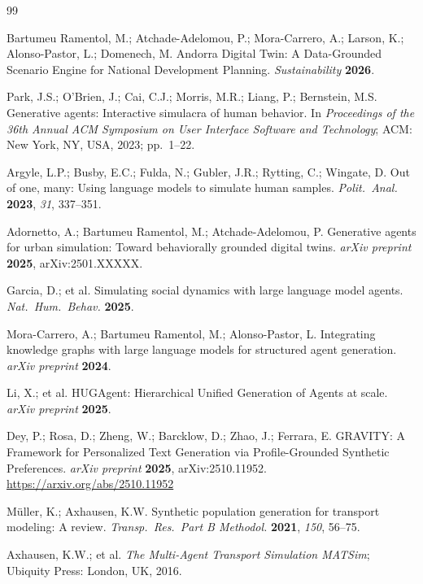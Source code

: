 \documentclass[a4paper,12pt]{article}
\begin{document}
\begin{thebibliography}{99}

Bartumeu Ramentol, M.; Atchade-Adelomou, P.; Mora-Carrero, A.; Larson, K.;
Alonso-Pastor, L.; Domenech, M. Andorra Digital Twin: A Data-Grounded Scenario
Engine for National Development Planning. \textit{Sustainability} \textbf{2026}.

Park, J.S.; O'Brien, J.; Cai, C.J.; Morris, M.R.; Liang, P.; Bernstein, M.S.
Generative agents: Interactive simulacra of human behavior.
In \textit{Proceedings of the 36th Annual ACM Symposium on User Interface
Software and Technology}; ACM: New York, NY, USA, 2023; pp.~1--22.

Argyle, L.P.; Busby, E.C.; Fulda, N.; Gubler, J.R.; Rytting, C.; Wingate, D.
Out of one, many: Using language models to simulate human samples.
\textit{Polit.\ Anal.} \textbf{2023}, \textit{31}, 337--351.

Adornetto, A.; Bartumeu Ramentol, M.; Atchade-Adelomou, P.
Generative agents for urban simulation: Toward behaviorally grounded digital
twins. \textit{arXiv preprint} \textbf{2025}, arXiv:2501.XXXXX.

Garcia, D.; et al. Simulating social dynamics with large language model agents.
\textit{Nat.\ Hum.\ Behav.} \textbf{2025}.

Mora-Carrero, A.; Bartumeu Ramentol, M.; Alonso-Pastor, L.
Integrating knowledge graphs with large language models for structured agent
generation. \textit{arXiv preprint} \textbf{2024}.

Li, X.; et al. HUGAgent: Hierarchical Unified Generation of Agents at scale.
\textit{arXiv preprint} \textbf{2025}.

Dey, P.; Rosa, D.; Zheng, W.; Barcklow, D.; Zhao, J.; Ferrara, E.
GRAVITY: A Framework for Personalized Text Generation via Profile-Grounded
Synthetic Preferences.
\textit{arXiv preprint} \textbf{2025}, arXiv:2510.11952.
\url{https://arxiv.org/abs/2510.11952}

M{\"u}ller, K.; Axhausen, K.W. Synthetic population generation for transport
modeling: A review. \textit{Transp.\ Res.\ Part B Methodol.} \textbf{2021},
\textit{150}, 56--75.

Axhausen, K.W.; et al.
\textit{The Multi-Agent Transport Simulation MATSim}; Ubiquity Press: London,
UK, 2016.


\end{thebibliography}
\end{document}
